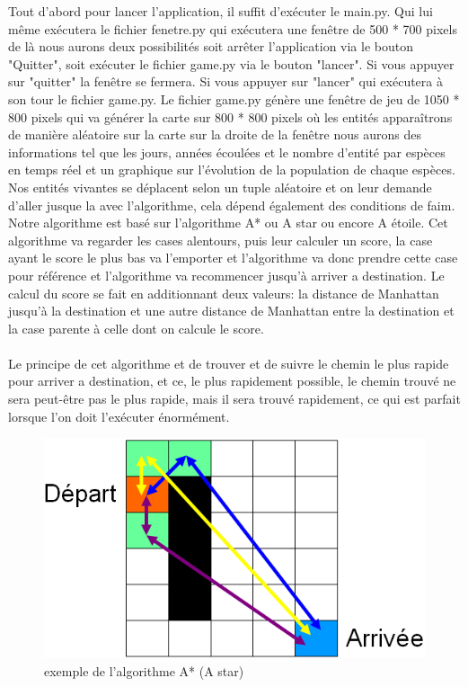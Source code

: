 \documentclass[a4paper, 11pt]{article}
\begin{document}
Tout d'abord pour lancer l'application, il suffit d’exécuter le main.py. Qui lui même exécutera le fichier fenetre.py qui exécutera une fenêtre de 500 * 700 pixels de là nous aurons deux possibilités soit arrêter l'application via le bouton "Quitter", soit exécuter le fichier game.py via le bouton "lancer". Si vous appuyer sur "quitter" la fenêtre se fermera. Si vous appuyer sur "lancer" qui exécutera à son tour le fichier game.py. Le fichier game.py génère une fenêtre de jeu de 1050 * 800 pixels qui va générer la carte sur 800 * 800 pixels où les entités apparaîtrons de manière aléatoire sur la carte
sur la droite de la fenêtre nous aurons des informations tel que les jours, années écoulées et le nombre d'entité par espèces en temps réel et un graphique sur l'évolution de la population de chaque espèces.\\
Nos entités vivantes se déplacent selon un tuple aléatoire et on leur demande d'aller jusque la avec l'algorithme, cela dépend également des conditions de faim.\\
Notre algorithme est basé sur l'algorithme A* ou A star ou encore A étoile. Cet algorithme va regarder les cases alentours, puis leur calculer un score, la case ayant le score le plus bas va l'emporter et l'algorithme va donc prendre cette case pour référence et l'algorithme va recommencer jusqu'à arriver a destination. Le calcul du score se fait en additionnant deux valeurs: la distance de Manhattan jusqu'à la destination et une autre distance de Manhattan entre la destination et la case parente à celle dont on calcule le score.\\
\\
Le principe de cet algorithme et de trouver et de suivre le chemin le plus rapide pour arriver a destination, et ce, le plus rapidement possible, le chemin trouvé ne sera peut-être pas le plus rapide, mais il sera trouvé rapidement, ce qui est parfait lorsque l'on doit l'exécuter énormément.
\begin{figure}[ht!]
 \centering
 \includegraphics[width=\linewidth]{images/exemple_algo_A_star.png}
 \caption{exemple de l'algorithme A* (A star)}
 \label{fig::example::one}
\end{figure}
\newpage
\end{document}
